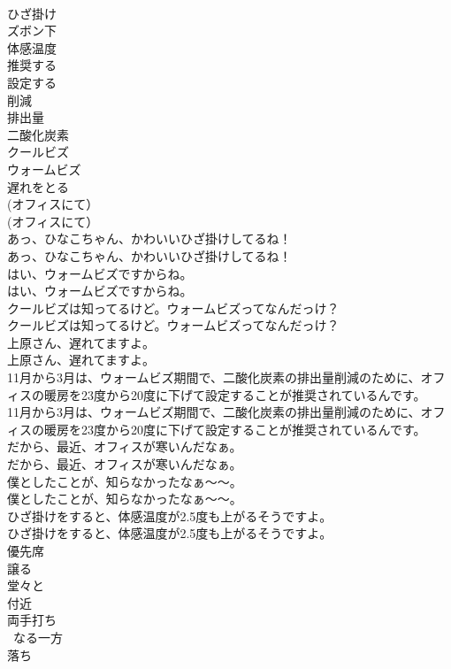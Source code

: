 \documentclass[8pt]{extreport}
\begin{document}
\begin{CJK}{UTF8}{min}
\\	ひざ掛け
\\	ズボン下
\\	体感温度
\\	推奨する
\\	設定する
\\	削減
\\	排出量
\\	二酸化炭素
\\	クールビズ
\\	ウォームビズ
\\	遅れをとる
\\	(オフィスにて）	
\\	(オフィスにて） 
\\	あっ、ひなこちゃん、かわいいひざ掛けしてるね！	
\\	あっ、ひなこちゃん、かわいいひざ掛けしてるね！ 
\\	はい、ウォームビズですからね。	
\\	はい、ウォームビズですからね。 
\\	クールビズは知ってるけど。ウォームビズってなんだっけ？	
\\	クールビズは知ってるけど。ウォームビズってなんだっけ？ 
\\	上原さん、遅れてますよ。	
\\	上原さん、遅れてますよ。 
\\	11月から3月は、ウォームビズ期間で、二酸化炭素の排出量削減のために、オフィスの暖房を23度から20度に下げて設定することが推奨されているんです。	
\\	11月から3月は、ウォームビズ期間で、二酸化炭素の排出量削減のために、オフィスの暖房を23度から20度に下げて設定することが推奨されているんです。 
\\	だから、最近、オフィスが寒いんだなぁ。	
\\	だから、最近、オフィスが寒いんだなぁ。 
\\	僕としたことが、知らなかったなぁ～～。	
\\	僕としたことが、知らなかったなぁ～～。 
\\	ひざ掛けをすると、体感温度が2.5度も上がるそうですよ。	
\\	ひざ掛けをすると、体感温度が2.5度も上がるそうですよ。 
\\	優先席
\\	譲る
\\	堂々と
\\	付近
\\	両手打ち
\\	~なる一方
\\	落ち

\end{CJK}
\end{document}
